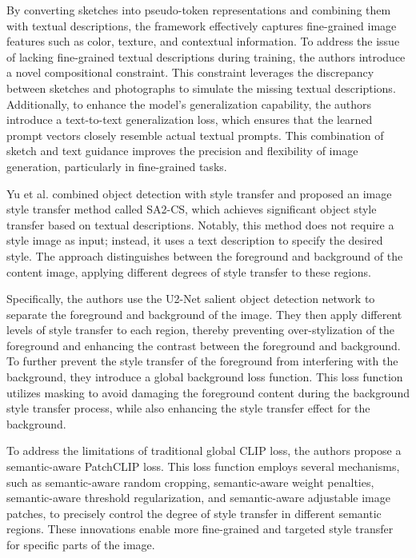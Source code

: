 \documentclass[preprint,12pt]{elsarticle}
\begin{document}
By converting sketches into pseudo-token representations and combining them with textual descriptions, the framework effectively captures fine-grained image features such as color, texture, and contextual information. To address the issue of lacking fine-grained textual descriptions during training, the authors introduce a novel compositional constraint. This constraint leverages the discrepancy between sketches and photographs to simulate the missing textual descriptions. Additionally, to enhance the model's generalization capability, the authors introduce a text-to-text generalization loss, which ensures that the learned prompt vectors closely resemble actual textual prompts. This combination of sketch and text guidance improves the precision and flexibility of image generation, particularly in fine-grained tasks.

Yu et al.\citep{107yu2024foreground} combined object detection with style transfer and proposed an image style transfer method called SA2-CS, which achieves significant object style transfer based on textual descriptions. Notably, this method does not require a style image as input; instead, it uses a text description to specify the desired style. The approach distinguishes between the foreground and background of the content image, applying different degrees of style transfer to these regions.

Specifically, the authors use the U2-Net salient object detection network to separate the foreground and background of the image. They then apply different levels of style transfer to each region, thereby preventing over-stylization of the foreground and enhancing the contrast between the foreground and background. To further prevent the style transfer of the foreground from interfering with the background, they introduce a global background loss function. This loss function utilizes masking to avoid damaging the foreground content during the background style transfer process, while also enhancing the style transfer effect for the background.

To address the limitations of traditional global CLIP loss, the authors propose a semantic-aware PatchCLIP loss. This loss function employs several mechanisms, such as semantic-aware random cropping, semantic-aware weight penalties, semantic-aware threshold regularization, and semantic-aware adjustable image patches, to precisely control the degree of style transfer in different semantic regions. These innovations enable more fine-grained and targeted style transfer for specific parts of the image.
\end{document}
